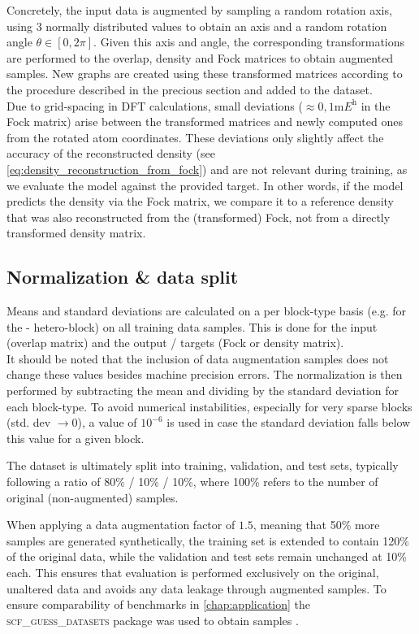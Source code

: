 Concretely, the input data is augmented by sampling a random rotation axis, using 3 normally distributed values to obtain an axis and a random rotation angle $\theta \in [0, 2\pi]$. Given this axis and angle, the corresponding transformations are performed to the overlap, density and Fock matrices to obtain augmented samples. New graphs are created using these transformed matrices according to the procedure described in the precious section and added to the dataset. \\
Due to grid-spacing in DFT calculations, small deviations ($\approx 0,1 \unit{\milli\hartree}$ in the Fock matrix) arise between the transformed matrices and newly computed ones from the rotated atom coordinates. These deviations only slightly affect the accuracy of the reconstructed density (see \autoref{eq:density_reconstruction_from_fock}) and are not relevant during training, as we evaluate the model against the provided target. In other words, if the model predicts the density via the Fock matrix, we compare it to a reference density that was also reconstructed from the (transformed) Fock, not from a directly transformed density matrix. %

\subsection{Normalization \& data split}
\label{subsec:gnn_normalization}
Means and standard deviations are calculated on a per block-type basis (e.g. for the - hetero-block) on all training data samples. This is done for the input (overlap matrix) and the output / targets (Fock or density matrix).\\
It should be noted that the inclusion of data augmentation samples does not change these values besides machine precision errors. The normalization is then performed by subtracting the mean and dividing by the standard deviation for each block-type. To avoid numerical instabilities, especially for very sparse blocks (std. dev $\rightarrow 0$), a value of $10^{-6}$ is used in case the standard deviation falls below this value for a given block.

The dataset is ultimately split into training, validation, and test sets, typically following a ratio of 80\% / 10\% / 10\%, where 100\% refers to the number of original (non-augmented) samples.

When applying a data augmentation factor of $1.5$, meaning that 50\% more samples are generated synthetically, the training set is extended to contain 120\% of the original data, while the validation and test sets remain unchanged at 10\% each. This ensures that evaluation is performed exclusively on the original, unaltered data and avoids any data leakage through augmented samples. To ensure comparability of benchmarks in \autoref{chap:application} the \textsc{scf\_guess\_datasets} package was used to obtain samples \parencite{ref:milacher_scf_guess_datasets}.

